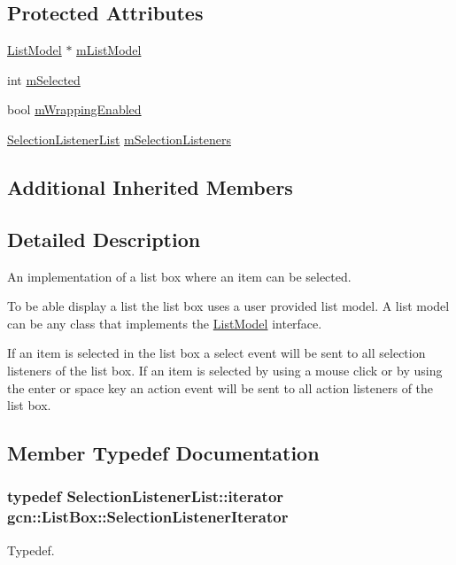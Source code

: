 \subsection*{Protected Attributes}
\begin{DoxyCompactItemize}
\item 
\hyperlink{classgcn_1_1ListModel}{List\+Model} $\ast$ \hyperlink{classgcn_1_1ListBox_aee337cd65f69ddf72e938458230b3bd1}{m\+List\+Model}
\item 
int \hyperlink{classgcn_1_1ListBox_a2cee9d2192c81586270392d43c95fb74}{m\+Selected}
\item 
bool \hyperlink{classgcn_1_1ListBox_ae1ea512562123a9b34b4d3c9f3312060}{m\+Wrapping\+Enabled}
\item 
\hyperlink{classgcn_1_1ListBox_aa44c39772de49bdc05368b7cc319d595}{Selection\+Listener\+List} \hyperlink{classgcn_1_1ListBox_a65f84e35f3d0a145a101b502b0cdc62e}{m\+Selection\+Listeners}
\end{DoxyCompactItemize}
\subsection*{Additional Inherited Members}


\subsection{Detailed Description}
An implementation of a list box where an item can be selected.

To be able display a list the list box uses a user provided list model. A list model can be any class that implements the \hyperlink{classgcn_1_1ListModel}{List\+Model} interface.

If an item is selected in the list box a select event will be sent to all selection listeners of the list box. If an item is selected by using a mouse click or by using the enter or space key an action event will be sent to all action listeners of the list box. 

\subsection{Member Typedef Documentation}
\subsubsection[{\texorpdfstring{Selection\+Listener\+Iterator}{SelectionListenerIterator}}]{\setlength{\rightskip}{0pt plus 5cm}typedef Selection\+Listener\+List\+::iterator {\bf gcn\+::\+List\+Box\+::\+Selection\+Listener\+Iterator}\hspace{0.3cm}{\ttfamily [protected]}}\hypertarget{classgcn_1_1ListBox_ad4eec42ff931f3d0893425f7eccb7923}{}\label{classgcn_1_1ListBox_ad4eec42ff931f3d0893425f7eccb7923}
Typedef. 
